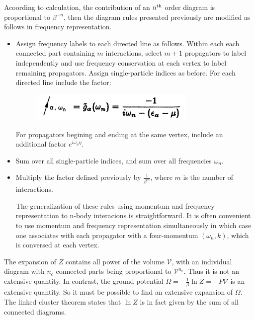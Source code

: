 \documentclass[12pt]{article}
\begin{document}
Acoording to calculation, the contribution of an $\rm n^{th}$ order diagram is 
proportional to $\beta^{-n}$, then the diagram rules presented previously are 
modified as follows in frequency representation.
\begin{itemize}
    \item Assign frequency labels to each directed line as follows. Within each 
    each connected part containing $m$ interactions, select $m+1$ propagators to 
    label independently and use frequency conservation at each vertex to label 
    remaining propagators. Assign single-particle indices as before. For each 
    directed line include the factor:
    \begin{figure}[H]
        \centering
        \includegraphics[width=8cm]{p11.png}
        \caption{}
        \label{}
    \end{figure} 
    For propagators begining and ending at the same vertex, include an additional 
    factor $e^{i\omega_n\eta}$.
    \item Sum over all single-particle indices, and sum over all frequencies 
    $\omega_n$.
    \item Multiply the factor defined previously by $\frac{1}{\beta^m}$, where 
    $m$ is the number of interactions.

    The generalization of these rules using momentum and frequency representation 
    to n-body interacions is straightforward. It is often convenient to use 
    momentum and frequency representation simultaneously in which case one 
    associates with each propagator with a four-momentum $(\omega_n,k)$, which is 
    conversed at each vertex.
\end{itemize} 

The expansion of $Z$ contains all power of the volume $\mathcal{V}$, with an 
individual diagram with $n_c$ connected parts being proportional to 
$\mathcal{V}^{n_c}$. Thus it is not an extensive quantity. In contrast, the 
ground potential $\Omega=-\frac{1}{\beta}\ln Z=-P\mathcal{V}$ is an extensive 
quantity. So it must be possible to find an extensive expansion of $\Omega$.
The linked cluster theorem states that $\ln Z$ is in fact given by the sum of all  
connected diagrams.
\end{document}

